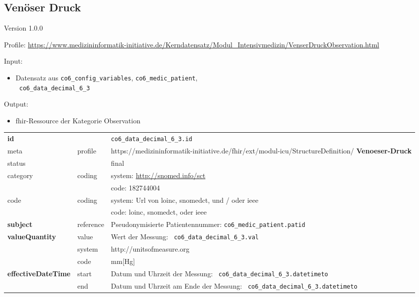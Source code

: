 \subsection{Venöser Druck} 
\noindent Version 1.0.0

\noindent Profile: \url{https://www.medizininformatik-initiative.de/Kerndatensatz/Modul_Intensivmedizin/VenserDruckObservation.html}

\noindent Input:
\begin{itemize}
	\item Datensatz aus \texttt{co6\_config\_variables}, \texttt{co6\_medic\_patient}, \\ \texttt{
co6\_data\_decimal\_6\_3}
\end{itemize}
Output:
\begin{itemize}
        \item \ac{fhir}-Ressource der Kategorie \glqq Observation\grqq{}
\end{itemize}
\begin{longtable}{|l|l|p{7.5cm}|}
        \hline
        \rowcolor{lightgray} \multicolumn{3}{|l|}{Data Mapping (inhaltlich)} \\ \hline
        \textbf{id} &  & \texttt{co6\_data\_decimal\_6\_3.id} \\ \hline
	meta & profile & https://medizininformatik-initiative.de/fhir/ext/modul-icu/StructureDefinition/\textbf{
Venoeser-Druck} \\ \hline 
	status &  & final   \\ \hline 
	category & coding & system: \url{http://snomed.info/sct} \\
\cline{3-3}
	& & code: 182744004 \\ \hline
	code & coding & system: Url von \ac{loinc}, \ac{snomedct}, und / oder \ac{ieee} \\ 
	\cline{3-3} 
	 &  & code: \ac{loinc}, \ac{snomedct}, oder \ac{ieee} \\ \hline
	 \textbf{subject}  & reference & Pseudonymisierte Patientennummer: \texttt{co6\_medic\_patient.patid} \\ \hline
	 \textbf{valueQuantity}  & value & Wert der Messung: \texttt{
co6\_data\_decimal\_6\_3.val} \\
        \cline{2-3}
         & system & http://unitsofmeasure.org \\
         \cline{2-3}
         & code & mm[Hg] \\ \hline
     \textbf{effectiveDateTime}  & start & Datum und Uhrzeit der Messung: \texttt{
co6\_data\_decimal\_6\_3.datetimeto} \\
    \cline{2-3}
     & end & Datum und Uhrzeit am Ende der Messung: \texttt{
co6\_data\_decimal\_6\_3.datetimeto} \\ \hline
\end{longtable}


